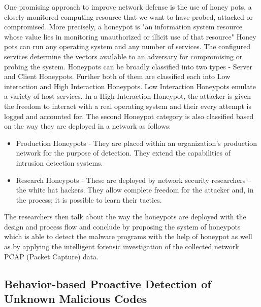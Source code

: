 \documentclass[11pt]{article}
\begin{document}
	One promising approach to improve network defense is the use of honey pots, a closely monitored computing resource that we want to have probed, attacked or compromised. More precisely, a honeypot is "an information system resource whose value lies in monitoring unauthorized or illicit use of that resource" Honey pots can run any operating system and any number of services. The configured services determine the vectors available to an adversary for compromising or probing the system. Honeypots can be broadly classified into two types - Server and Client Honeypots. Further both of them are classified each into Low interaction and High Interaction Honeypots. Low Interaction Honeypots emulate a variety of host services. In a High Interaction Honeypot, the attacker is given the freedom to interact with a real operating system and their every attempt is logged and accounted for. The second Honeypot category is also classified based on the way they are deployed in a network as follows:
	\begin{itemize}
		\item Production Honeypots - They are placed within an organization’s production network for the purpose of detection. They extend the capabilities of intrusion detection systems.
		\item Research Honeypots - These are deployed by network security researchers – the white hat hackers. They allow complete freedom for the attacker and, in the process; it is possible to learn their tactics.
	\end{itemize}
	The researchers then talk about the way the honeypots are deployed with the design and process flow and conclude by proposing the system of honeypots which is able to detect the malware programs with the help of honeypot as well as by applying the intelligent forensic investigation of the collected network PCAP (Packet Capture) data.
	
	\subsection{Behavior-based Proactive Detection of Unknown Malicious Codes}
	
\end{document}
